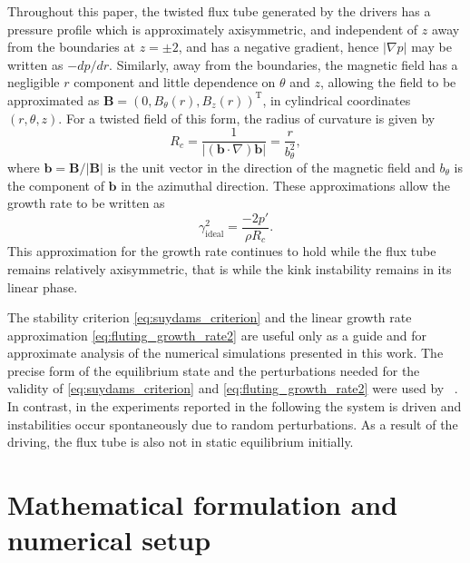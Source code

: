 \documentclass[fleqn,usenatbib]{mnras}
\newcommand{\rev}[1]{{\color{red} {#1}}}
\newcommand{\revcite}[1]{{\color{red} \underline{#1}}}
\renewcommand{\vec}[1]{{\bm #1}}
\begin{document}
Throughout this paper, the twisted flux tube generated by the drivers has
a pressure profile which is approximately axisymmetric, and independent of $z$
away from the boundaries at $z=\pm2$, and has a negative gradient, hence
$|\nabla p|$ may be written as $-d p/ dr$. Similarly, away from the boundaries,
the magnetic field has a negligible $r$ component and little dependence on
$\theta$ and $z$, allowing the field to be approximated as $\vec{B} = (0,
B_{\theta}(r), B_z(r))^{\text{T}}$, in cylindrical coordinates $(r, \theta,
z)$. For a twisted field of this form, the radius of curvature is given by
\begin{equation} \label{eq:radius_of_curvature} R_c
= \frac{1}{|(\vec{b}\cdot\nabla) \vec{b}|} = \frac{r}{b_{\theta}^2},
\end{equation} where $\vec{b} = \vec{B}/|\vec{B}|$ is the unit vector in the
direction of the magnetic field and $b_{\theta}$ is the component of $\vec{b}$
in the azimuthal direction. \rev{These approximations allow} the growth rate to be
written as
\begin{equation}
\label{eq:fluting_growth_rate2}
\gamma_{\text{ideal}}^2 = \frac{-2p'}{\rho R_c}.
\end{equation}
This approximation for the growth rate continues to hold while the flux tube
remains relatively axisymmetric, that is while the kink instability remains in
its linear phase.

The stability criterion \eqref{eq:suydams_criterion} and the linear growth rate
approximation \eqref{eq:fluting_growth_rate2} are useful only as a guide and
for approximate analysis of the numerical simulations presented in this work.
The precise form of the equilibrium state and the perturbations needed for the
validity of \eqref{eq:suydams_criterion} and \eqref{eq:fluting_growth_rate2}
were used by~\revcite{\citet{quinnEffectAnisotropicViscosity2020}}. In contrast, in the
experiments reported in the following the system is driven and instabilities
occur spontaneously due to random perturbations. As a result of the driving, the
flux tube is also not in static equilibrium initially.

\section{Mathematical formulation and numerical setup}
\label{sec-numerical-setup}
\end{document}
